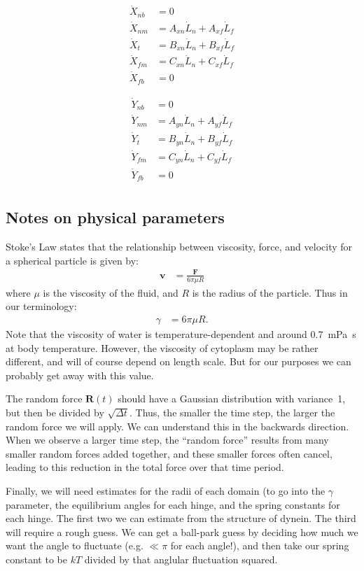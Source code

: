 \documentclass[11pt, landscape]{article}
\begin{document}
\begin{align}
  \dot{X}_{nb} &= 0 \\
  \dot{X}_{nm} &= A_{xn}\dot{L}_n + A_{xf}\dot{L}_f\\
  \dot{X}_{t } &= B_{xn}\dot{L}_n + B_{xf}\dot{L}_f\\
  \dot{X}_{fm} &= C_{xn}\dot{L}_n + C_{xf}\dot{L}_f\\
  \dot{X}_{fb} &= 0
\end{align}  

\begin{align}                                                                          
  \dot{Y}_{nb} &= 0 \\                           
  \dot{Y}_{nm} &= A_{yn}\dot{L}_n + A_{yf}\dot{L}_f\\
  \dot{Y}_{t}  &= B_{yn}\dot{L}_n + B_{yf}\dot{L}_f\\
  \dot{Y}_{fm} &= C_{yn}\dot{L}_n + C_{yf}\dot{L}_f\\
  \dot{Y}_{fb} &= 0 \\
\end{align}

\begin{twocolumn}
\section{Notes on physical parameters}

Stoke's Law states that the relationship between viscosity, force, and
velocity for a spherical particle is given by:
\begin{align}
  \mathbf{v} &= \frac{\mathbf{F}}{6\pi \mu R}
\end{align}
where $\mu$ is the viscosity of the fluid, and $R$ is the radius of
the particle.  Thus in our terminology:
\begin{align}
  \gamma &= 6\pi \mu R.
\end{align}
Note that the viscosity of water is temperature-dependent and around
0.7~mPa~s at body temperature.  However, the viscosity of cytoplasm
may be rather different, and will of course depend on length scale.
But for our purposes we can probably get away with this value.

The random force $\mathbf{R}(t)$ should have a Gaussian distribution
with variance~1, but then be divided by $\sqrt{\Delta t}$.  Thus, the
smaller the time step, the larger the random force we will apply.  We
can understand this in the backwards direction.  When we observe a
larger time step, the ``random force'' results from many smaller
random forces added together, and these smaller forces often cancel,
leading to this reduction in the total force over that time period.

Finally, we will need estimates for the radii of each domain (to go
into the $\gamma$ parameter, the equilibrium angles for each hinge, and
the spring constants for each hinge.  The first two we can estimate
from the structure of dynein.  The third will require a rough guess.
We can get a ball-park guess by deciding how much we want the angle to
fluctuate (e.g. $\ll \pi$ for each angle!), and then take our spring
constant to be $kT$ divided by that anglular fluctuation squared.

\end{twocolumn}
\end{document}
